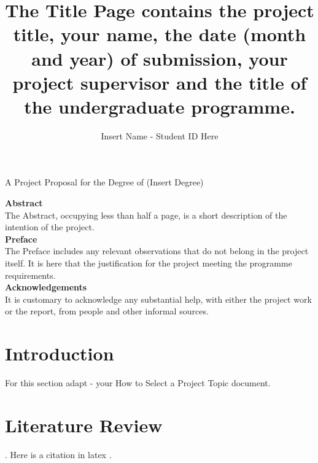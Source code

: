 \documentclass{report} %
\begin{document}

\title{The Title Page contains the project title, your name, the date (month and year) of submission, your project supervisor and the title of the undergraduate programme.} %
\author{Insert Name - Student ID Here} %

\maketitle %

{
	\centering
	A Project Proposal for the Degree of (Insert Degree)

} %
\textbf{Abstract}\\
The Abstract, occupying less than half a page, is a short description of the intention of the project.\\
\textbf{Preface}\\
The Preface includes any relevant observations that do not belong in the project itself.  It is here that the justification for the project meeting the programme requirements.\\
\textbf{Acknowledgements}\\
It is customary to acknowledge any substantial help, with either the project work or the report, from people and other informal sources.\\

\tableofcontents



\listoftables

\listoffigures

\chapter{Introduction}
For this section adapt - your How to Select a Project Topic document.

\chapter{Literature Review} %
. 
Here is a citation in latex \citep{citeme}. %
\end{document}
